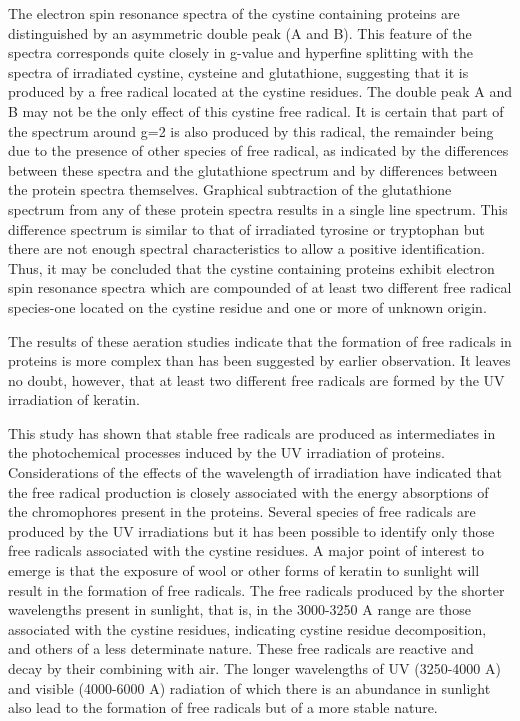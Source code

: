 \documentclass[]{interact}
\theoremstyle{plain}%
\theoremstyle{definition}
\theoremstyle{remark}
\begin{document}
The electron spin resonance spectra of the cystine containing proteins are distinguished by an asymmetric double peak (A and B). This feature of the spectra corresponds quite closely in g-value and hyperfine splitting with the spectra of irradiated cystine, cysteine and glutathione, suggesting that it is produced by a free radical located at the cystine residues. The double peak A and B may not be the only effect of this cystine free radical. It is certain that part of the spectrum around g=2 is also produced by this radical, the remainder being due to the presence of other species of free radical, as indicated by the differences between these spectra and the glutathione spectrum and by differences between the protein spectra themselves. Graphical subtraction of the glutathione spectrum from any of these
protein spectra results in a single line spectrum. This difference spectrum is similar to that of irradiated tyrosine or tryptophan but there are not enough spectral characteristics to allow a positive identification. Thus, it may be
concluded that the cystine containing proteins exhibit electron spin resonance spectra which are compounded of at least two different free radical species-one located on the cystine residue and one or more of unknown origin.

The results of these aeration studies indicate that the formation of free radicals in proteins is more complex than has been suggested by earlier observation. It leaves no doubt, however, that at least two different free radicals are formed by the UV irradiation of keratin.


This study has shown that stable free radicals are produced as intermediates in the
photochemical processes induced by the UV irradiation of proteins. Considerations
of the effects of the wavelength of irradiation have indicated that the free radical production is closely associated with the energy absorptions of the chromophores present in the proteins. Several species of free radicals are produced by the UV irradiations but it has been possible to identify only those free radicals associated with the cystine residues.
A major point of interest to emerge is that the exposure of wool or other forms of keratin to sunlight will result in the formation of free radicals. The free radicals produced by the shorter wavelengths present in sunlight, that is, in the 3000-3250 A range are those associated with the cystine residues, indicating cystine residue decomposition, and others of a less determinate nature. These free radicals are reactive and decay by their combining with air. The longer wavelengths of UV (3250-4000 A) and visible (4000-6000 A) radiation of which there is an abundance in sunlight also lead to the formation of free radicals but of a more stable nature.
\end{document}
